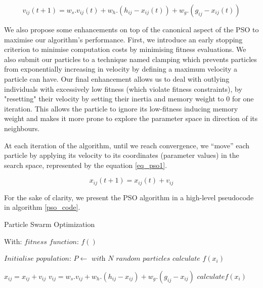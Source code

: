 \documentclass[conference]{IEEEtran}
\begin{document}
\begin{equation}
v_{ij}(t+1) = w_{s}.v_{ij}(t) + w_{h}.(h_{ij}-x_{ij}(t))+w_{g}.(g_{ij}-x_{ij}(t)) \label{eqvel}
\end{equation}


We also propose some enhancements on top of the canonical aspect of the PSO to maximise our algorithm’s performance. First, we introduce an early stopping criterion to minimise computation costs by minimising fitness evaluations. We also submit our particles to a technique named clamping which prevents particles from exponentially increasing in velocity by defining a maximum velocity a particle can have.
Our final enhancement allows us to deal with outlying individuals with excessively low fitness (which violate fitness constraints), by "resetting" their velocity by setting their inertia and memory  weight to 0 for one iteration. This allows the particle to ignore its low-fitness inducing memory weight and makes it more prone to explore the parameter space in direction of its neighbours.

At each iteration of the algorithm, until we reach convergence, we “move” each particle by applying its velocity to its coordinates (parameter values) in the search space, represented by the equation \ref{eq_pso1}.

\begin{equation}
x_{ij}(t+1) = x_{ij}(t) + v_{ij}  \label{eq_pso1}
\end{equation}

For the sake of clarity, we present the PSO algorithm in a high-level pseudocode in algorithm \ref{pso_code}.

\begin{algorithm}[htbp]
\caption{Particle Swarm Optimization}\label{pso_code}
With:
$\textit{fitness function: } f()$
\begin{algorithmic}[1]
\State $\textit{Initialise population: } P \gets \textit{ with } N \textit{ random particles}$
 {$ \textit{calculate }f(x_{i})$}
\EndFor
{} {
            
            \State $x_{ij} = x_{ij} + v_{ij}$
            \State $v_{ij} = w_{s}.v_{ij} + w_{h}.(h_{ij}-x_{ij})+w_{g}.(g_{ij}-x_{ij})$
        \EndFor
    \EndFor
     {$ \textit{calculate}f(x_{i})$}\EndFor
}\EndWhile
\end{algorithmic}
\end{algorithm}
   
\end{document}
